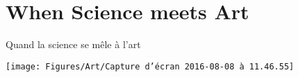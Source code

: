 


\chapter{When Science meets Art}{Quand la science se mêle à l'art} %

\label{app:art} %




\texttt{[image: Figures/Art/Capture d’écran 2016-08-08 à 11.46.55]}

